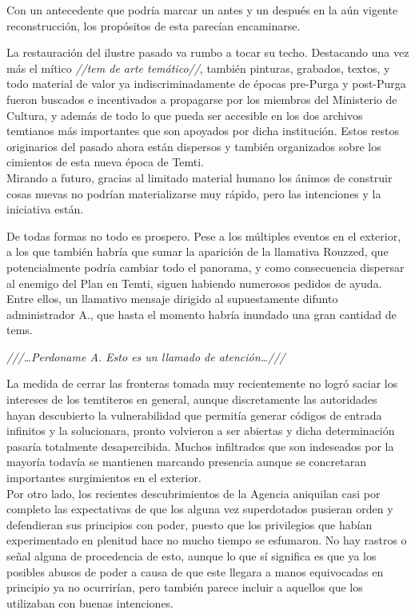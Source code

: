 \documentclass[
  spanish,
]{book}
\begin{document}
Con un antecedente que podría marcar un antes y un después en la aún vigente reconstrucción, los propósitos de esta parecían encaminarse.

La restauración del ilustre pasado va rumbo a tocar su techo. Destacando una vez más el mítico \emph{//tem de arte temático//}, también pinturas, grabados, textos, y todo material de valor ya indiscriminadamente de épocas pre-Purga y post-Purga fueron buscados e incentivados a propagarse por los miembros del Ministerio de Cultura, y además de todo lo que pueda ser accesible en los dos archivos temtianos más importantes que son apoyados por dicha institución. Estos restos originarios del pasado ahora están dispersos y también organizados sobre los cimientos de esta nueva época de Temti.\\
Mirando a futuro, gracias al limitado material humano los ánimos de construir cosas nuevas no podrían materializarse muy rápido, pero las intenciones y la iniciativa están.

De todas formas no todo es prospero. Pese a los múltiples eventos en el exterior, a los que también habría que sumar la aparición de la llamativa Rouzzed, que potencialmente podría cambiar todo el panorama, y como consecuencia dispersar al enemigo del Plan en Temti, siguen habiendo numerosos pedidos de ayuda. Entre ellos, un llamativo mensaje dirigido al supuestamente difunto administrador A., que hasta el momento habría inundado una gran cantidad de tems.

\emph{///\ldots Perdoname A. Esto es un llamado de atención\ldots///}

La medida de cerrar las fronteras tomada muy recientemente no logró saciar los intereses de los temtiteros en general, aunque discretamente las autoridades hayan descubierto la vulnerabilidad que permitía generar códigos de entrada infinitos y la solucionara, pronto volvieron a ser abiertas y dicha determinación pasaría totalmente desapercibida. Muchos infiltrados que son indeseados por la mayoría todavía se mantienen marcando presencia aunque se concretaran importantes surgimientos en el exterior.\\
Por otro lado, los recientes descubrimientos de la Agencia aniquilan casi por completo las expectativas de que los alguna vez superdotados pusieran orden y defendieran sus principios con poder, puesto que los privilegios que habían experimentado en plenitud hace no mucho tiempo se esfumaron. No hay rastros o señal alguna de procedencia de esto, aunque lo que sí significa es que ya los posibles abusos de poder a causa de que este llegara a manos equivocadas en principio ya no ocurrirían, pero también parece incluir a aquellos que los utilizaban con buenas intenciones.
\end{document}
